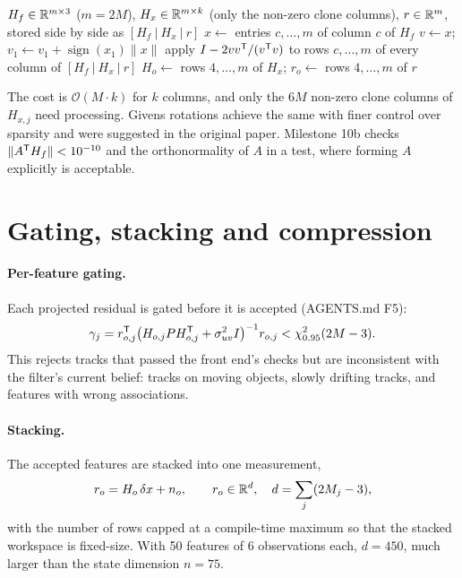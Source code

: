 \begin{algorithm}[h]
\caption{Left-nullspace projection by Householder reflections}
\label{alg:nullspace-householder}
\begin{algorithmic}[1]
\Require $H_f \in \mathbb{R}^{m\times3}$ ($m = 2M$), $H_x \in \mathbb{R}^{m\times k}$ (only the non-zero clone columns), $r \in \mathbb{R}^m$, stored side by side as $[H_f\ |\ H_x\ |\ r]$
  \State $x \gets$ entries $c, \dots, m$ of column $c$ of $H_f$
  \State $v \gets x$; \quad $v_1 \gets v_1 + \operatorname{sign}(x_1)\|x\|$ 
  \State apply $I - 2vv^{\mathsf{T}}/(v^{\mathsf{T}} v)$ to rows $c, \dots, m$ of every column of $[H_f\ |\ H_x\ |\ r]$
\EndFor
\State $H_o \gets$ rows $4, \dots, m$ of $H_x$; \quad $r_o \gets$ rows $4, \dots, m$ of $r$ 
\end{algorithmic}
\end{algorithm}

The cost is $\mathcal{O}(M\cdot k)$ for $k$ columns, and only the $6M$ non-zero clone columns of $H_{x,j}$ need processing. Givens rotations achieve the
same with finer control over sparsity and were suggested in the original paper. Milestone 10b checks
$\|A^{\mathsf{T}} H_f\| < 10^{-10}$ and the orthonormality of $A$ in a test, where forming $A$ explicitly is acceptable.

\section{Gating, stacking and compression}

\paragraph{Per-feature gating.} Each projected residual is gated before it is accepted (AGENTS.md F5):
\begin{equation}
  \gamma_j = r_{o,j}^{\mathsf{T}}\big(H_{o,j}PH_{o,j}^{\mathsf{T}} + \sigma_{uv}^2I\big)^{-1} r_{o,j} < \chi^2_{0.95}(2M - 3).
\end{equation}
This rejects tracks that passed the front end's checks but are inconsistent with the filter's current belief: tracks on moving
objects, slowly drifting tracks, and features with wrong associations.

\paragraph{Stacking.} The accepted features are stacked into one measurement,
\begin{equation}
  r_o = H_o\,\delta x + n_o, \qquad r_o \in \mathbb{R}^d,\quad d = \sum_j (2M_j - 3),
\end{equation}
with the number of rows capped at a compile-time maximum so that the stacked workspace is fixed-size. With 50 features of 6
observations each, $d = 450$, much larger than the state dimension $n = 75$.

